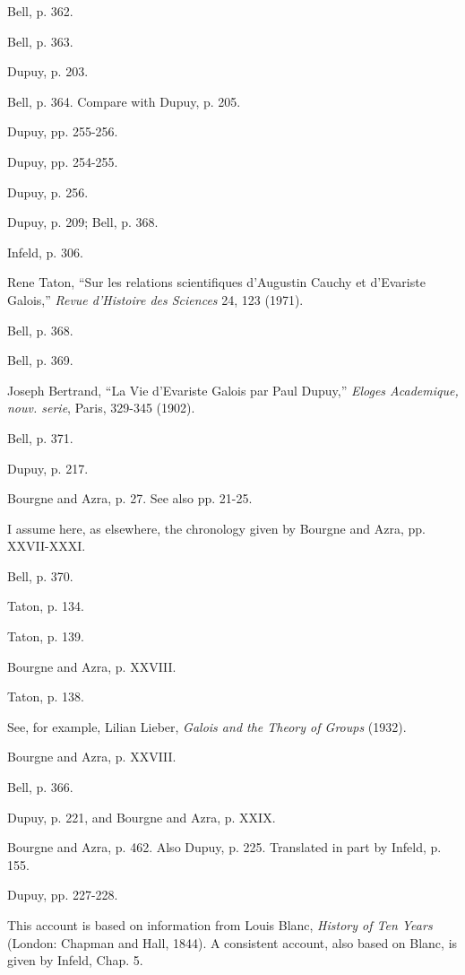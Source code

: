 \documentclass[12pt]{article}
\begin{document}
\begin{thebibliography}{9999}
 Bell, p. 362. 

 Bell, p. 363. 

 Dupuy, p. 203. 

 Bell, p. 364. Compare with Dupuy, p. 205. 

 Dupuy, pp. 255-256. 

 Dupuy, pp. 254-255. 

 Dupuy, p. 256. 

 Dupuy, p. 209; Bell, p. 368. 

 Infeld, p. 306. 

 Rene Taton, ``Sur les relations scientifiques d'Augustin Cauchy et d'Evariste Galois,'' \emph{Revue d'Histoire des
Sciences} 24, 123 (1971). 

 Bell, p. 368. 

 Bell, p. 369. 

 Joseph Bertrand, ``La Vie d'Evariste Galois par Paul Dupuy,'' \emph{Eloges Academique, nouv. serie}, Paris, 329-345 (1902). 

 Bell, p. 371. 

 Dupuy, p. 217. 

 Bourgne and Azra, p. 27. See also pp. 21-25. 

 I assume here, as elsewhere, the chronology given by Bourgne and Azra, pp. XXVII-XXXI. 

 Bell, p. 370. 

 Taton, p. 134. 

 Taton, p. 139. 

 Bourgne and Azra, p. XXVIII. 

 Taton, p. 138. 

 See, for example, Lilian Lieber, \emph{Galois and the Theory of Groups} (1932).

 Bourgne and Azra, p. XXVIII. 

 Bell, p. 366. 

 Dupuy, p. 221, and Bourgne and Azra, p. XXIX.

 Bourgne and Azra, p. 462. Also Dupuy, p. 225. Translated in part by Infeld, p. 155. 

 Dupuy, pp. 227-228. 

 This account is based on information from Louis Blanc, \emph{History of Ten Years} (London: Chapman and Hall, 1844). A
consistent account, also based on Blanc, is given by Infeld, Chap. 5. 


\end{thebibliography}
\end{document}
